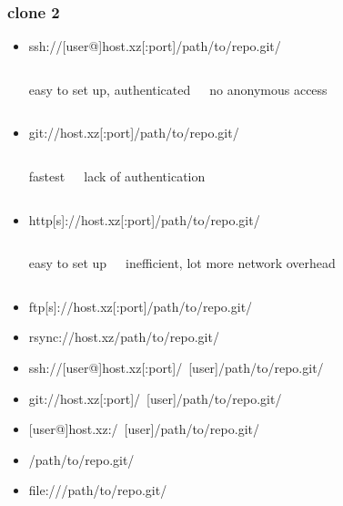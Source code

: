 \documentclass{beamer}
\begin{document}
		\begin{frame}
			\frametitle{clone 2}
			\begin{itemize}
				\item ssh://[user@]host.xz[:port]/path/to/repo.git/
					\begin{itemize}
						\begin{columns}
							easy to set up, authenticated

							no anonymous access
						\end{columns}
					\end{itemize}
				\item git://host.xz[:port]/path/to/repo.git/
					\begin{itemize}
						\begin{columns}
							\column{.3\textwidth}
							fastest

							\column{.3\textwidth}
							lack of authentication
						\end{columns}
					\end{itemize}
				\item http[s]://host.xz[:port]/path/to/repo.git/
					\begin{itemize}
						\begin{columns}
							\column{.3\textwidth}
							easy to set up

							\column{.3\textwidth}
							inefficient, lot more network overhead
						\end{columns}
					\end{itemize}
				\item ftp[s]://host.xz[:port]/path/to/repo.git/
				\item rsync://host.xz/path/to/repo.git/
			\end{itemize}
			\begin{itemize}
				\item ssh://[user@]host.xz[:port]/~[user]/path/to/repo.git/
				\item git://host.xz[:port]/~[user]/path/to/repo.git/
				\item {[user@]}host.xz:/~[user]/path/to/repo.git/
			\end{itemize}
			\begin{itemize}
				\item /path/to/repo.git/
				\item file:///path/to/repo.git/
			\end{itemize}
		\end{frame}
\end{document}
